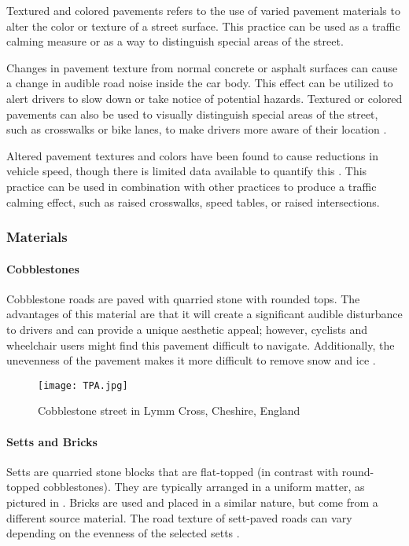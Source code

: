 Textured and colored pavements refers to the use of varied pavement materials to alter the color or texture of a street surface. This practice can be used as a traffic calming measure or as a way to distinguish special areas of the street.

Changes in pavement texture from normal concrete or asphalt surfaces can cause a change in audible road noise inside the car body. This effect can be utilized to alert drivers to slow down or take notice of potential hazards. Textured or colored pavements can also be used to visually distinguish special areas of the street, such as crosswalks or bike lanes, to make drivers more aware of their location \cite{TP1}.

Altered pavement textures and colors have been found to cause reductions in vehicle speed, though there is limited data available to quantify this \cite{TP3}. This practice can be used in combination with other practices to produce a traffic calming effect, such as raised crosswalks, speed tables, or raised intersections. 

\subsubsection{Materials}

\paragraph{Cobblestones} Cobblestone roads are paved with quarried stone with rounded tops. The advantages of this material are that it will create a significant audible disturbance to drivers and can provide a unique aesthetic appeal; however, cyclists and wheelchair users might find this pavement difficult to navigate. Additionally, the unevenness of the pavement makes it more difficult to remove snow and ice \cite{TP6}.

\begin{figure}[!htbp]
\centering
\texttt{[image: TPA.jpg]}
\caption[Cobblestone street in Lymm Cross, Cheshire, England]{Cobblestone street in Lymm Cross, Cheshire, England}\label{fig:TPA}
\end{figure}

\paragraph{Setts and Bricks} Setts are quarried stone blocks that are flat-topped (in contrast with round-topped cobblestones). They are typically arranged in a uniform matter, as pictured in . Bricks are used and placed in a similar nature, but come from a different source material.  The road texture of sett-paved roads can vary depending on the evenness of the selected setts \cite{TP4}.


